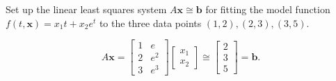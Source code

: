 \begin{pro}
  Set up the linear least squares system $A\mathbf{x}\cong \mathbf{b}$
  for fitting the model function $f(t, \mathbf{x}) = x_1t+x_2e^t$
  to the three data points $(1, 2), (2, 3), (3,5)$.
\end{pro}
\begin{sol}
  \begin{displaymath}
    A\mathbf{x} =
    \begin{bmatrix}
      1 & e \\
      2 & e^2 \\
      3 & e^3
    \end{bmatrix}
    \begin{bmatrix}
      x_1 \\
      x_2
    \end{bmatrix}
    \cong
    \begin{bmatrix}
      2 \\
      3 \\
      5
    \end{bmatrix}
    = \mathbf{b}.
  \end{displaymath}
\end{sol}
